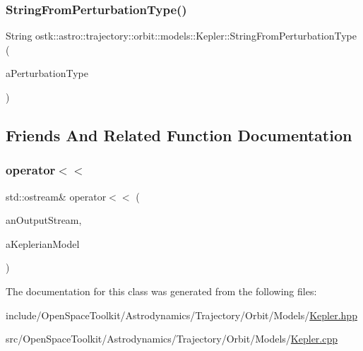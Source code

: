 \subsubsection{\texorpdfstring{String\+From\+Perturbation\+Type()}{StringFromPerturbationType()}}
{\footnotesize\ttfamily String ostk\+::astro\+::trajectory\+::orbit\+::models\+::\+Kepler\+::\+String\+From\+Perturbation\+Type (\begin{DoxyParamCaption}\item[{const \hyperlink{classostk_1_1astro_1_1trajectory_1_1orbit_1_1models_1_1_kepler_a3750f9177ff06a1938826e2c2881d5a9}{Kepler\+::\+Perturbation\+Type} \&}]{a\+Perturbation\+Type }\end{DoxyParamCaption})\hspace{0.3cm}{\ttfamily [static]}}



\subsection{Friends And Related Function Documentation}
\mbox{\label{classostk_1_1astro_1_1trajectory_1_1orbit_1_1models_1_1_kepler_aedb386ce32716dfb187f89b52b023f2b}} 
\subsubsection{\texorpdfstring{operator$<$$<$}{operator<<}}
{\footnotesize\ttfamily std\+::ostream\& operator$<$$<$ (\begin{DoxyParamCaption}\item[{std\+::ostream \&}]{an\+Output\+Stream,  }\item[{const \hyperlink{classostk_1_1astro_1_1trajectory_1_1orbit_1_1models_1_1_kepler}{Kepler} \&}]{a\+Keplerian\+Model }\end{DoxyParamCaption})\hspace{0.3cm}{\ttfamily [friend]}}



The documentation for this class was generated from the following files\+:\begin{DoxyCompactItemize}
\item 
include/\+Open\+Space\+Toolkit/\+Astrodynamics/\+Trajectory/\+Orbit/\+Models/\hyperlink{_kepler_8hpp}{Kepler.\+hpp}\item 
src/\+Open\+Space\+Toolkit/\+Astrodynamics/\+Trajectory/\+Orbit/\+Models/\hyperlink{_kepler_8cpp}{Kepler.\+cpp}\end{DoxyCompactItemize}
